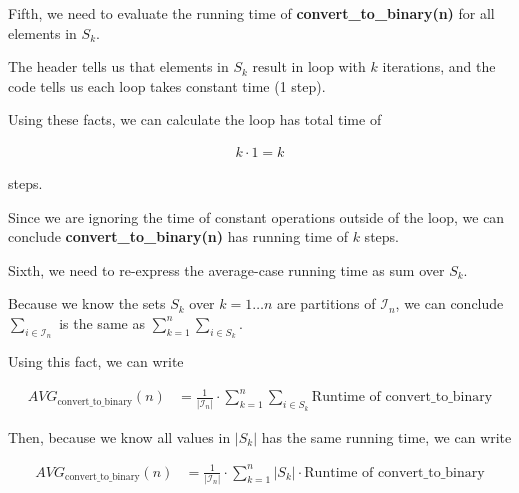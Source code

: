 \documentclass[12pt]{article}
\begin{document}
\begin{enumerate}[a.]
    \bigskip

    Fifth, we need to evaluate the running time of \textbf{convert\_to\_binary(n)}
    for all elements in $S_k$.

    \bigskip

    The header tells us that elements in $S_k$ result in loop with $k$ iterations, and
    the code tells us each loop takes constant time (1 step).

    \bigskip

    Using these facts, we can calculate the loop has total time of

    \begin{align}
        k \cdot 1 = k
    \end{align}

    steps.

    \bigskip

    Since we are ignoring the time of constant operations outside of the loop,
    we can conclude \textbf{convert\_to\_binary(n)} has running time of $k$ steps.

    \bigskip

    Sixth, we need to re-express the average-case running time as sum over $S_k$.

    \bigskip

    Because we know the sets $S_k$ over $k = 1 \dots n$ are partitions of
    $\mathcal{I}_n$, we can conclude $\sum\limits_{i \in \mathcal{I}_n}$
    is the same as $\sum\limits_{k = 1}^n \sum\limits_{i \in S_k}$.

    \bigskip

    Using this fact, we can write

    \begin{align}
        AVG_{\text{convert\_to\_binary}}(n) &= \frac{1}{\lvert \mathcal{I}_n \rvert} \cdot \sum\limits_{k = 1}^n \sum\limits_{i \in S_k} \text{Runtime of convert\_to\_binary}
    \end{align}

    \bigskip

    Then, because we know all values in $\lvert S_k \rvert$ has the same
    running time, we can write

    \begin{align}
        AVG_{\text{convert\_to\_binary}}(n) &= \frac{1}{\lvert \mathcal{I}_n \rvert} \cdot \sum\limits_{k = 1}^n \lvert S_k \rvert \cdot \text{Runtime of convert\_to\_binary}
    \end{align}

    \bigskip


\end{enumerate}
\end{document}
